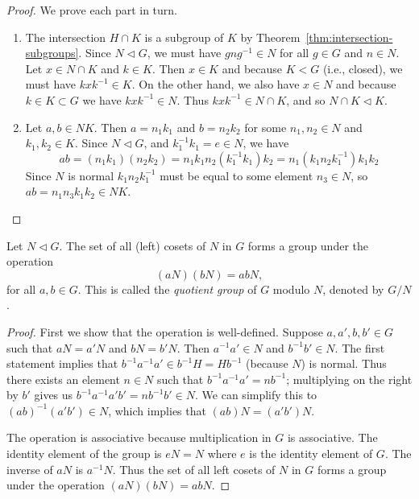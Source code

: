 \begin{proof}
    We prove each part in turn.
    \begin{enumerate}[label=(\alph*), wide]
        \item The intersection \(H \cap K\) is a subgroup of \(K\) by
        Theorem~\ref{thm:intersection-subgroups}. Since \(N \triangleleft G\),
        we must have \(gng^{-1} \in N\) for all \(g \in G\) and \(n \in N\). Let
        \(x \in N \cap K\) and \(k \in K\). Then \(x \in K\) and because \(K <
        G\) (i.e., closed), we must have \(kxk^{-1} \in K\). On the other hand,
        we also have \(x \in N\) and because \(k \in K \subset G\) we have
        \(kxk^{-1} \in N\). Thus \(kxk^{-1} \in N \cap K\), and so \(N \cap K
        \triangleleft K\).
        
        \item Let \(a, b \in NK\). Then \(a = n_1k_1\) and \(b = n_2k_2\) for
        some \(n_1, n_2 \in N\) and \(k_1, k_2 \in K\). Since \(N \triangleleft
        G\), and \(k^{-1}_1k_1 = e \in N\), we have
        \[
            ab = (n_1k_1)(n_2k_2) = n_1k_1n_2(k^{-1}_1k_1)k_2 = n_1(k_1n_2k^{-1}_1)k_1k_2
        \]
        Since \(N\) is normal \(k_1n_2k^{-1}_1\) must be equal to some element
        \(n_3 \in N\), so \(ab = n_1n_3k_1k_2 \in NK\).
    \end{enumerate}
\end{proof}

\begin{theorem}
    \label{thm:quotient-group}
    Let \(N \triangleleft G\). The set of all (left) cosets of \(N\) in \(G\)
    forms a group under the operation
    \[
        (aN)(bN) = abN,
    \]
    for all \(a, b \in G\). This is called the \emph{quotient group} of \(G\)
    modulo \(N\), denoted by \(G/N\).
\end{theorem}

\begin{proof}
    First we show that the operation is well-defined. Suppose \(a, a', b, b' \in
    G\) such that \(aN = a'N\) and \(bN = b'N\). Then \(a^{-1}a' \in N\) and
    \(b^{-1}b' \in N\). The first statement implies that \(b^{-1}a^{-1}a' \in
    b^{-1}H = Hb^{-1}\) (because \(N\)) is normal. Thus there exists an element
    \(n \in N\) such that \(b^{-1}a^{-1}a' = nb^{-1}\); multiplying on the right
    by \(b'\) gives us \(b^{-1}a^{-1}a'b' = nb^{-1}b' \in N\). We can simplify
    this to \((ab)^{-1}(a'b') \in N\), which implies that \((ab)N = (a'b')N\).

    The operation is associative because multiplication in \(G\) is associative.
    The identity element of the group is \(eN = N\) where \(e\) is the identity
    element of \(G\). The inverse of \(aN\) is \(a^{-1}N\). Thus the set of all
    left cosets of \(N\) in \(G\) forms a group under the operation \((aN)(bN) =
    abN\).
\end{proof}


